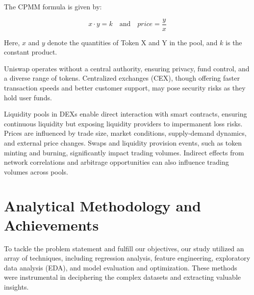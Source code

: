 \documentclass{article}
\begin{document}
{The CPMM formula is given by:

\[x \cdot y = k \quad \text{and} \quad price = \frac{y}{x}\]

Here, \(x\) and \(y\) denote the quantities of Token X and Y in the pool, and \(k\) is the constant product.

Uniswap operates without a central authority, ensuring privacy, fund control, and a diverse range of tokens. Centralized exchanges (CEX), though offering faster transaction speeds and better customer support, may pose security risks as they hold user funds.

Liquidity pools in DEXs enable direct interaction with smart contracts, ensuring continuous liquidity but exposing liquidity providers to impermanent loss risks. Prices are influenced by trade size, market conditions, supply-demand dynamics, and external price changes. Swaps and liquidity provision events, such as token minting and burning, significantly impact trading volumes. Indirect effects from network correlations and arbitrage opportunities can also influence trading volumes across pools.




\section*{\textbf{Analytical Methodology and Achievements}}

To tackle the problem statement and fulfill our objectives, our study utilized an array of techniques, including regression analysis, feature engineering, exploratory data analysis (EDA), and model evaluation and optimization. These methods were instrumental in deciphering the complex datasets and extracting valuable insights.

}
\end{document}
